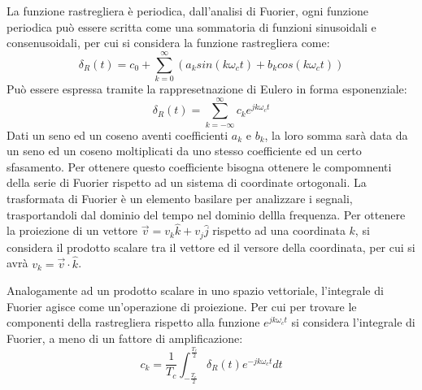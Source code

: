\documentclass{article}
\numberwithin{equation}{subsection}
\begin{document}
La funzione rastregliera è periodica, dall'analisi di Fuorier, ogni funzione periodica può essere scritta come una sommatoria di funzioni sinusoidali e consenusoidali, per 
cui si considera la funzione rastregliera come:
\begin{equation}
    \delta_R(t)=c_0+\sum_{k=0}^{\infty}\left(a_ksin(k\omega_ct)+b_kcos(k\omega_ct)\right)
\end{equation}
Può essere espressa tramite la rappresetnazione di Eulero in forma esponenziale:
\begin{equation}
    \delta_R(t)=\sum_{k=-\infty}^{\infty}c_ke^{jk\omega_ct}
\end{equation}
Dati un seno ed un coseno aventi coefficienti $a_k$ e $b_k$, la loro somma sarà data da un seno ed un coseno moltiplicati da uno stesso coefficiente ed un certo sfasamento. 
Per ottenere questo coefficiente bisogna ottenere le compomnenti della serie di Fuorier rispetto ad un sistema di coordinate ortogonali. La trasformata di Fuorier è un elemento basilare per analizzare 
i segnali, trasportandoli dal dominio del tempo nel dominio dellla frequenza. Per ottenere la 
proiezione di un vettore $\vec{v}=v_k\hat{k}+v_j\hat{j}$ rispetto ad una coordinata $k$, si considera il prodotto scalare tra il vettore ed il versore della coordinata, 
per cui si avrà $v_k=\vec{v}\cdot\hat{k}$. 

Analogamente ad un prodotto scalare in uno spazio vettoriale, l'integrale di Fuorier agisce come un'operazione di proiezione. Per cui per trovare le componenti della rastregliera 
rispetto alla funzione $e^{jk\omega_ct}$ si considera l'integrale di Fuorier, a meno di un fattore di amplificazione: 
\begin{equation}
    c_k=\displaystyle\frac{1}{T_c}\int_{-\frac{T_c}{2}}^{\frac{T_c}{2}}\delta_R(t)e^{-jk\omega_ct}dt
\end{equation}

\end{document}
